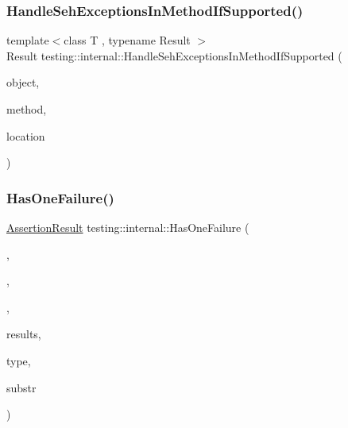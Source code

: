 \mbox{\label{namespacetesting_1_1internal_ac5293b438139ef7ed05cb7fcaaf63545}} 
\subsubsection{\texorpdfstring{Handle\+Seh\+Exceptions\+In\+Method\+If\+Supported()}{HandleSehExceptionsInMethodIfSupported()}}
{\footnotesize\ttfamily template$<$class T , typename Result $>$ \\
Result testing\+::internal\+::\+Handle\+Seh\+Exceptions\+In\+Method\+If\+Supported (\begin{DoxyParamCaption}\item[{T $\ast$}]{object,  }\item[{Result(T\+::$\ast$)()}]{method,  }\item[{const char $\ast$}]{location }\end{DoxyParamCaption})}

\mbox{\label{namespacetesting_1_1internal_a14ff02e6d151f45e998657674e9af88a}} 
\subsubsection{\texorpdfstring{Has\+One\+Failure()}{HasOneFailure()}}
{\footnotesize\ttfamily \hyperlink{classtesting_1_1_assertion_result}{Assertion\+Result} testing\+::internal\+::\+Has\+One\+Failure (\begin{DoxyParamCaption}\item[{const char $\ast$}]{,  }\item[{const char $\ast$}]{,  }\item[{const char $\ast$}]{,  }\item[{const \hyperlink{classtesting_1_1_test_part_result_array}{Test\+Part\+Result\+Array} \&}]{results,  }\item[{\hyperlink{classtesting_1_1_test_part_result_a65ae656b33fdfdfffaf34858778a52d5}{Test\+Part\+Result\+::\+Type}}]{type,  }\item[{const \hyperlink{namespacetesting_1_1internal_a8e8ff5b11e64078831112677156cb111}{string} \&}]{substr }\end{DoxyParamCaption})}

